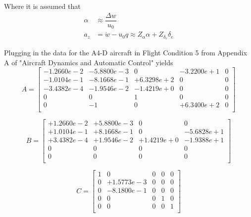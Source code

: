\documentclass[12pt]{article}
\begin{document}
\noindent Where it is assumed that
\begin{equation*}
\begin{split}
\alpha & \approx \dfrac{\Delta w}{u_0}\\
   a_z & = \dot{w} - u_0 q \approx Z_{\alpha} \alpha + Z_{\delta_e} \delta_e
\end{split}
\end{equation*}

\noindent Plugging in the data for the A4-D aircraft in Flight Condition 5 from Appendix A of "Aircraft Dynamics and Automatic Control" yields
\begin{equation*}
A =
\begin{bmatrix}
  -1.2660e-2 & -5.8800e-3 &          0 & -3.2200e+1  &          0 \\
  -1.0104e-1 & -8.1668e-1 & +6.3298e+2 &          0  &          0 \\
  -3.4382e-4 & -1.9546e-2 & -1.4219e+0 &          0  &          0 \\
           0 &          0 &          1 &          0  &          0 \\
           0 &         -1 &          0 & +6.3400e+2  &          0 \\
\end{bmatrix}
\end{equation*}

\begin{equation*}
B =
\begin{bmatrix}
   +1.2660e-2 & +5.8800e-3 &          0 &          0 \\
   +1.0104e-1 & +8.1668e-1 &          0 & -5.6828e+1 \\
   +3.4382e-4 & +1.9546e-2 & +1.4219e+0 & -1.9388e+1 \\
            0 &          0 &          0 &          0 \\
            0 &          0 &          0 &          0 \\
\end{bmatrix}
\end{equation*}

\begin{equation*}
C =
\begin{bmatrix}
           1 &          0 & 0 & 0 & 0 \\
           0 & +1.5773e-3 & 0 & 0 & 0 \\
           0 & -8.1800e-1 & 0 & 0 & 0 \\
           0 &          0 & 0 & 1 & 0 \\
           0 &          0 & 0 & 0 & 1 \\
\end{bmatrix}
\end{equation*}
\end{document}
